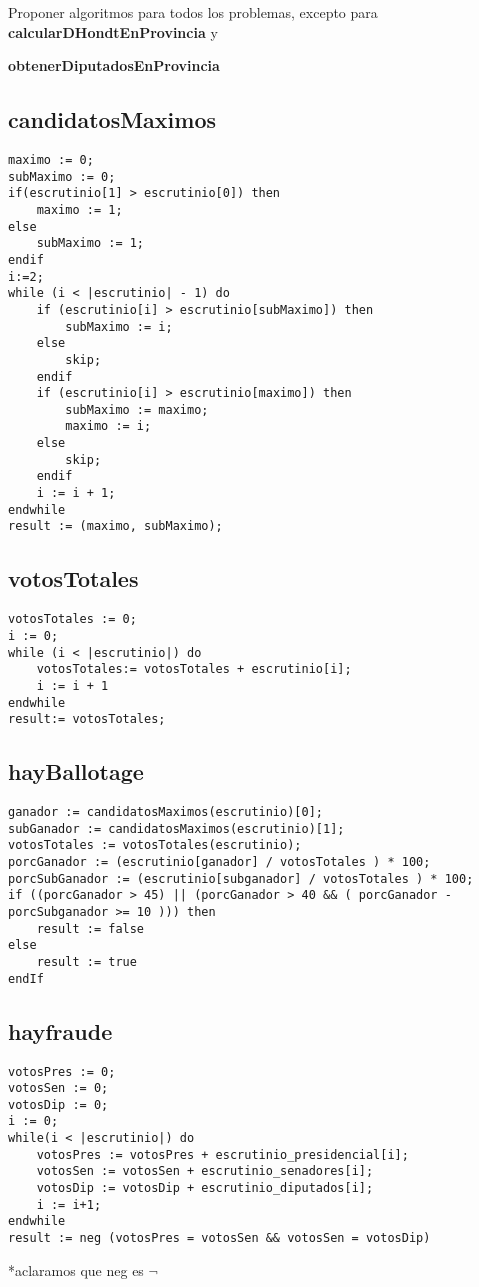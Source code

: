 \documentclass[10pt,a4paper]{article}
\begin{document}
Proponer algoritmos para todos los problemas, excepto para \textbf{calcularDHondtEnProvincia} y 

\textbf{obtenerDiputadosEnProvincia}



\subsection{candidatosMaximos}
\begin{lstlisting}
maximo := 0;
subMaximo := 0;
if(escrutinio[1] > escrutinio[0]) then
    maximo := 1;
else
    subMaximo := 1;
endif
i:=2;
while (i < |escrutinio| - 1) do
	if (escrutinio[i] > escrutinio[subMaximo]) then
		subMaximo := i;
	else
		skip;
	endif
	if (escrutinio[i] > escrutinio[maximo]) then
	    subMaximo := maximo;
	    maximo := i;
	else
		skip;
	endif
	i := i + 1;
endwhile
result := (maximo, subMaximo);
\end{lstlisting}

\subsection{votosTotales}
\begin{lstlisting}
votosTotales := 0;
i := 0;
while (i < |escrutinio|) do
	votosTotales:= votosTotales + escrutinio[i];
	i := i + 1
endwhile
result:= votosTotales;
\end{lstlisting}



\subsection{hayBallotage}
\begin{lstlisting}
ganador := candidatosMaximos(escrutinio)[0];
subGanador := candidatosMaximos(escrutinio)[1];
votosTotales := votosTotales(escrutinio);
porcGanador := (escrutinio[ganador] / votosTotales ) * 100;
porcSubGanador := (escrutinio[subganador] / votosTotales ) * 100;
if ((porcGanador > 45) || (porcGanador > 40 && ( porcGanador - porcSubganador >= 10 ))) then
    result := false 
else 
	result := true
endIf
\end{lstlisting}
\pagebreak


\subsection{hayfraude}
\begin{lstlisting}
votosPres := 0;
votosSen := 0;
votosDip := 0;
i := 0;
while(i < |escrutinio|) do 
    votosPres := votosPres + escrutinio_presidencial[i];
    votosSen := votosSen + escrutinio_senadores[i];
    votosDip := votosDip + escrutinio_diputados[i];
    i := i+1;
endwhile
result := neg (votosPres = votosSen && votosSen = votosDip)
\end{lstlisting}
*aclaramos que neg es $\neg$
\end{document}
